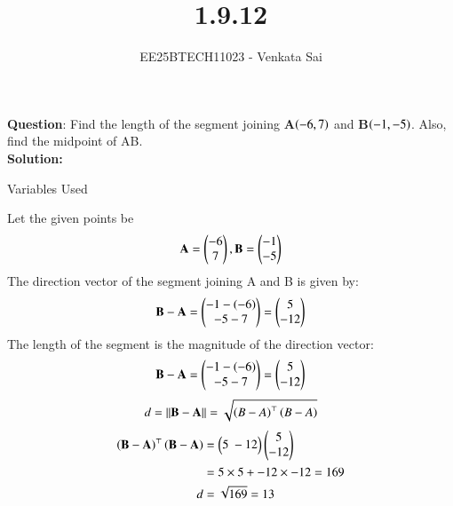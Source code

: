 \documentclass[journal]{IEEEtran}
\begin{document}


\title{1.9.12}
\author{EE25BTECH11023 - Venkata Sai}
{\let\newpage\relax\maketitle}

\renewcommand{\thefigure}{\theenumi}
\renewcommand{\thetable}{\theenumi}

\renewcommand{\thetable}{\theenumi}

\textbf{Question}:\newline
Find the length of the segment joining \textbf{A}$\left(-6,7\right)$ and \textbf{B}$\left(-1,-5\right)$. Also, find the
midpoint of AB. 
\\
\textbf{Solution: }
\begin{table}[H]    
  \centering
  
  \caption{Variables Used}
\end{table}
Let the given points be
 \begin{align}
 \mathbf{A} = \begin{pmatrix}-6 \\ 7\end{pmatrix}, \mathbf{B} = \begin{pmatrix}-1 \\ -5\end{pmatrix} 
 \end{align}
The direction vector of the segment joining A and B is given by:
\begin{align}
\mathbf{B} - \mathbf{A} = \begin{pmatrix}-1 - (-6) \\ -5 - 7\end{pmatrix} = \begin{pmatrix}5 \\ -12\end{pmatrix} 
\end{align}
The length of the segment is the magnitude of the direction vector:
 \begin{align}
\mathbf{B} - \mathbf{A} = \begin{pmatrix}-1 - (-6) \\ -5 - 7\end{pmatrix} = \begin{pmatrix}5 \\ -12\end{pmatrix}  
\end{align}
\begin{align}
d = \|\mathbf{B-A}\| = \sqrt{\left(B-A\right)^\top \left(B-A\right)} 
\end{align}
\begin{align}
\brak{\vec{B}-\vec{A}}^\top \brak{\vec{B}-\vec{A}}&=\myvec{5  \ -12}\myvec{5 \\ -12}\\
&=5\times5+-12\times-12 = 169\\
d &=\sqrt{169}=13
\end{align}
\end{document}
